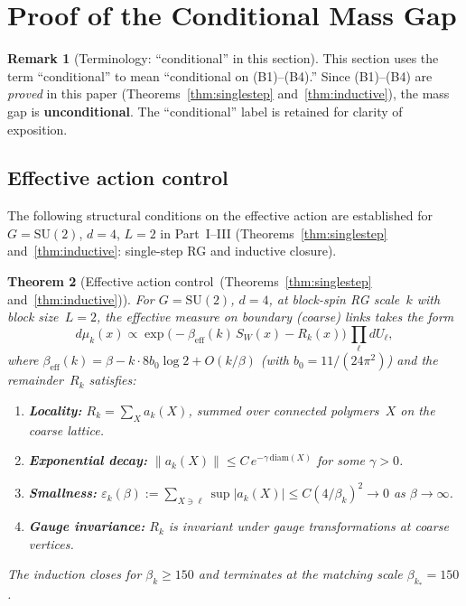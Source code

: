 \documentclass[11pt]{article}
\newtheorem{theorem}{Theorem}[section]
\theoremstyle{definition}
\newtheorem{remark}[theorem]{Remark}
\newcommand{\SU}{\mathrm{SU}}
\newcommand{\diam}{\mathrm{diam}}
\begin{document}


\section{Proof of the Conditional Mass Gap}\label{syn-sec:conditional}

\begin{remark}[Terminology: ``conditional'' in this section]
This section uses the term ``conditional'' to mean
``conditional on (B1)--(B4).''
Since (B1)--(B4) are \emph{proved} in this paper
(Theorems~\ref{thm:singlestep} and~\ref{thm:inductive}),
the mass gap is \textbf{unconditional}.
The ``conditional'' label is retained for clarity of exposition.
\end{remark}

\subsection{Effective action control}

The following structural conditions on the effective action
are established for $G = \SU(2)$, $d = 4$, $L = 2$ in
Part~I--III
(Theorems~\ref{thm:singlestep} and~\ref{thm:inductive}: single-step RG
and inductive closure).

\begin{theorem}[Effective action control~{(Theorems~\ref{thm:singlestep} and~\ref{thm:inductive})}]
\label{syn-thm:eac}
For $G = \SU(2)$, $d = 4$, at block-spin RG scale~$k$ with
block size~$L = 2$, the effective
measure on boundary (coarse) links takes the form
\begin{equation}\label{syn-eq:balaban}
  d\mu_k(x) \propto \exp\!\bigl(-\beta_{\mathrm{eff}}(k)
  \,S_W(x) - R_k(x)\bigr)\,\prod_\ell dU_\ell,
\end{equation}
where $\beta_{\mathrm{eff}}(k) = \beta - k\cdot 8b_0\log 2
+ O(k/\beta)$ (with $b_0 = 11/(24\pi^2)$)
and the remainder~$R_k$ satisfies:
\begin{enumerate}[label=\textup{(B\arabic*)},nosep]
  \item \textbf{Locality:} $R_k = \sum_X a_k(X)$, summed over
    connected polymers~$X$ on the coarse lattice.
  \item \textbf{Exponential decay:}
    $\|a_k(X)\| \leq C\,e^{-\gamma\,\diam(X)}$ for
    some $\gamma > 0$.
  \item \textbf{Smallness:}
    $\varepsilon_k(\beta) := \sum_{X \ni \ell}
    \sup|a_k(X)| \leq C(4/\beta_k)^2 \to 0$
    as $\beta \to \infty$.
  \item \textbf{Gauge invariance:} $R_k$ is invariant under
    gauge transformations at coarse vertices.
\end{enumerate}
The induction closes for $\beta_k \geq 150$ and terminates at the
matching scale $\beta_{k_*} = 150$.
\end{theorem}
\end{document}
